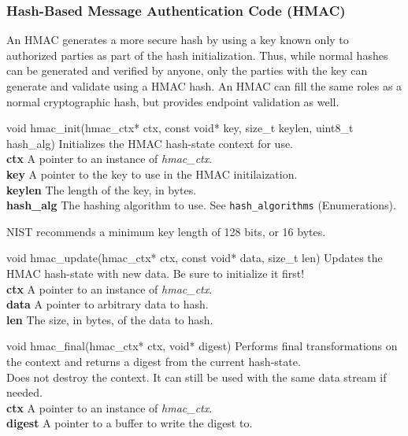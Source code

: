 \documentclass[titlepage]{article}
\begin{document}
		\subsubsection{Hash-Based Message Authentication Code (HMAC)}
			An HMAC generates a more secure hash by using a key known only to authorized parties as part of the hash initialization. Thus, while normal hashes can be generated and verified by anyone, only the parties with the key can generate and validate using a HMAC hash. An HMAC can fill the same roles as a normal cryptographic hash, but provides endpoint validation as well.
			\begin{functionspec}[]{void hmac\_init(hmac\_ctx* ctx, const void* key, size\_t keylen, uint8\_t hash\_alg)}
				Initializes the HMAC hash-state context for use.\\
				\textbf{ctx} A pointer to an instance of \textit{hmac\_ctx}.\\
				\textbf{key} A pointer to the key to use in the HMAC initilaization.\\
				\textbf{keylen} The length of the key, in bytes.\\
				\textbf{hash\_alg} The hashing algorithm to use. See \texttt{hash\_algorithms} (Enumerations).
				\begin{notespec}
					NIST recommends a minimum key length of 128 bits, or 16 bytes.
				\end{notespec}
			\end{functionspec}
			\vspace{1mm}
			\begin{functionspec}[]{void hmac\_update(hmac\_ctx* ctx, const void* data, size\_t len)}
				Updates the HMAC hash-state with new data. Be sure to initialize it first!\\
				\textbf{ctx} A pointer to an instance of \textit{hmac\_ctx}.\\
				\textbf{data} A pointer to arbitrary data to hash.\\
				\textbf{len} The size, in bytes, of the data to hash.
			\end{functionspec}
			\vspace{1mm}
			\begin{functionspec}[]{void hmac\_final(hmac\_ctx* ctx, void* digest)}
				Performs final transformations on the context and returns a digest from the current hash-state.\\
				Does not destroy the context. It can still be used with the same data stream if needed.\\
				\textbf{ctx} A pointer to an instance of \textit{hmac\_ctx}.\\
				\textbf{digest} A pointer to a buffer to write the digest to.
			\end{functionspec}
		
\end{document}
